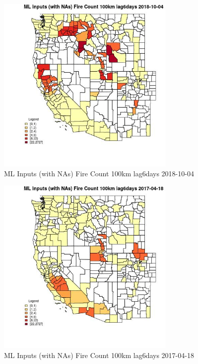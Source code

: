 \clearpage 

\begin{figure} 
\centering  
\includegraphics[width=0.77\textwidth]{Code_Outputs/Report_ML_input_PM25_Step4_part_f_de_duplicated_aves_prioritize_24hr_obswNAs_CountyFire_Count_100km_lag6daysMean2018-10-04.jpg} 
\caption{\label{fig:Report_ML_input_PM25_Step4_part_f_de_duplicated_aves_prioritize_24hr_obswNAsCountyFire_Count_100km_lag6daysMean2018-10-04}ML Inputs (with NAs) Fire Count 100km lag6days 2018-10-04} 
\end{figure} 
 

\begin{figure} 
\centering  
\includegraphics[width=0.77\textwidth]{Code_Outputs/Report_ML_input_PM25_Step4_part_f_de_duplicated_aves_prioritize_24hr_obswNAs_CountyFire_Count_100km_lag6daysMean2017-04-18.jpg} 
\caption{\label{fig:Report_ML_input_PM25_Step4_part_f_de_duplicated_aves_prioritize_24hr_obswNAsCountyFire_Count_100km_lag6daysMean2017-04-18}ML Inputs (with NAs) Fire Count 100km lag6days 2017-04-18} 
\end{figure} 
 

